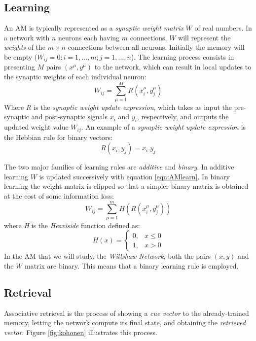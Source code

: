 \documentclass{article}
\begin{document}
\subsection{Learning}
An AM is typically represented as a \textit{synaptic weight matrix} $W$ of real numbers. In a network with $n$ neurons each having $m$ connections, $W$ will represent the \textit{weights} of the  $m \times n$ connections between all neurons. Initially the memory will be empty ($W_{ij} = 0 : i=1, \ldots, m ;  j=1, \ldots, n  $). The learning process consists in presenting $M$ pairs $\left(x^{\mu}, y^{\mu}\right)$ to the network, which can result in local updates to the synaptic weights of each individual neuron:
\begin{equation}
\label{eqn:AMlearn}
    W_{ij}=\sum_{\mu=1}^{M} R \left( x_{i}^{\mu} , y_{j}^{\mu}\right)
\end{equation}
Where $R$ is the\textit{ synaptic weight update expression}, which takes as input the pre-synaptic and post-synaptic signals $x_i$ and $y_i$, respectively, and outputs the updated weight value $W_{ij}$. An example of a \textit{ synaptic weight update expression} is the Hebbian rule \cite{hebb2005organization} for binary vectors:
\begin{equation}
    R \left( x_i,y_j \right) = x_i . y_j
\end{equation}

The two major families of learning rules are \textit{additive} and \textit{binary}. In additive learning $W$ is updated successively with equation \ref{eqn:AMlearn}. In binary learning the weight matrix is clipped so that a simpler binary matrix is obtained at the cost of some information loss:
\begin{equation}
    W_{ij}=\sum_{\mu=1}^{m}H\left( R \left( x_{i}^{\mu}, y_{j}^{\mu}\right) \right)
\end{equation}
where \textit{H} is the \textit{Heaviside} function defined as:
\begin{equation}
    H(x)=\left\{\begin{array}{ll}
0, & x\leq 0 \\
1, & x > 0
\end{array}\right.
\label{eqn:heaviside}
\end{equation}
In the AM that we will study, the \textit{Willshaw Network}, both the pairs $(x,y)$ and the $W$ matrix are binary. This means that a binary learning rule is employed.

\subsection{Retrieval}
Associative retrieval is the process of showing a \textit{cue vector} to the already-trained memory, letting the network compute its final state, and obtaining the \textit{retrieved vector}. Figure \ref{fig:kohonen} illustrates this process. 
\end{document}
